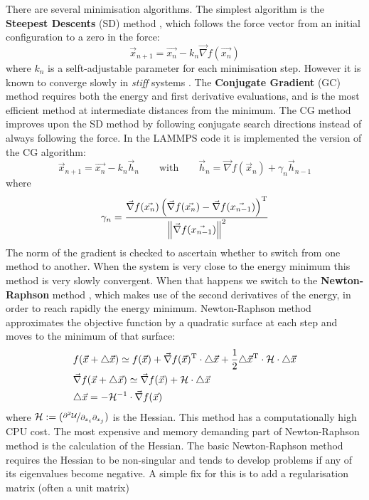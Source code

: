 There are several minimisation algorithms. The simplest algorithm is the \textbf{Steepest Descents} (SD) method \cite{Sheppard2008}, which follows the force vector from an initial configuration to a zero in the force:
\begin{equation}
\label{eq:SD}
\vec{x}_{n+1}=\vec{x_n}-k_n\vec{\nabla}f(\vec{x_n})
\end{equation}
where $k_n$ is a selft-adjustable parameter for each minimisation step. However it is known to converge slowly in \textit{stiff} systems \cite{Press:1996:NRF:232468}. The \textbf{Conjugate Gradient} (GC) method requires both the energy and first derivative evaluations, and is the most efficient method at intermediate distances from the minimum. The CG method improves upon the SD method by following conjugate search directions instead of always following the force. In the LAMMPS code it is implemented the \citet{polak1969note} version of the CG algorithm:
\begin{equation}
\label{eq:CG}
\vec{x}_{n+1}=\vec{x_n}-k_n\vec{h}_n\qquad\text{with}\qquad\vec{h}_n=\vec{\nabla}f(\vec{x}_n)+\gamma_n\vec{h}_{n-1}
\end{equation} where
\begin{equation}
\gamma_n=\frac{\vec{\nabla}f(\vec{x_n})\left( \vec{\nabla}f(\vec{x_n}) - \vec{\nabla}f(\vec{x_{n-1}})\right)^\text{T} }{\left\lVert\vec{\nabla}f(\vec{x_{n-1}})\right\rVert^2}
\end{equation} The norm of the gradient is checked to ascertain whether to switch from one method to another. When the system is very close to the energy minimum this method is very slowly convergent. When that happens we switch to the \textbf{Newton-Raphson} method \cite{nocedal2006numerical}, which makes use of the second derivatives of the energy, in order to reach rapidly the energy minimum. Newton-Raphson method approximates the objective function by a quadratic surface at each step and moves to the minimum of that surface:
\begin{align*}
\label{eq:NR}
& f(\vec{x}+\triangle\vec{x}) \simeq f(\vec{x})+\vec{\nabla}f(\vec{x})^{\text{T}}\cdot\triangle\vec{x} + \frac{1}{2}\triangle\vec{x}^\text{T}\cdot\mathcal{H}\cdot\triangle\vec{x} \\
& \vec{\nabla}f(\vec{x}+\triangle\vec{x}) \simeq \vec{\nabla}f(\vec{x})+ \mathcal{H}\cdot\triangle\vec{x} \\
& \triangle\vec{x} = -\mathcal{H}^{-1}\cdot\vec{\nabla}f(\vec{x})
\end{align*} where $\mathcal{H}:=(\nicefrac{\partial^2\mathcal{U}}{\partial_{x_i}\partial_{x_j}})$ is the Hessian. This method has a computationally high CPU cost. The most expensive and memory demanding part of Newton-Raphson method is the calculation of the Hessian. The basic Newton-Raphson method requires the Hessian to be non-singular and tends to develop problems if any of its eigenvalues become negative. A simple fix for this is to add a regularisation matrix (often a unit matrix)
